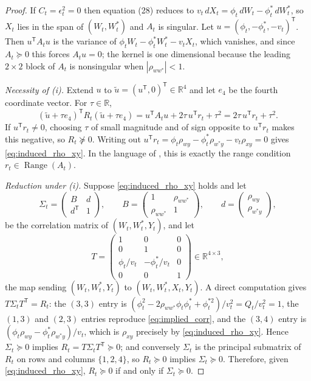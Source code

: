 \documentclass[11pt]{article}
\theoremstyle{definition}
\newcommand{\R}{\mathbb{R}}
\newcommand{\Range}{\operatorname{Range}}
\begin{document}
\begin{proof}
If $C_t=\epsilon_t^2=0$ then equation (28) reduces to $v_t\,dX_t=\phi_t\,dW_t-\phi_t^*\,dW_t^*$, so $X_t$ lies in the span of $(W_t,W_t^*)$ and $A_t$ is singular. Let $u=(\phi_t,-\phi_t^*,-v_t)^{\mathsf T}$. Then $u^{\mathsf T}A_tu$ is the variance of $\phi_tW_t-\phi_t^*W_t^*-v_tX_t$, which vanishes, and since $A_t\succeq0$ this forces $A_tu=0$; the kernel is one dimensional because the leading $2\times2$ block of $A_t$ is nonsingular when $|\rho_{ww^*}|<1$.

\emph{Necessity of \textnormal{(i)}.} Extend $u$ to $\tilde u=(u^{\mathsf T},0)^{\mathsf T}\in\R^4$ and let $e_4$ be the fourth coordinate vector. For $\tau\in\R$,
\[
(\tilde u+\tau e_4)^{\mathsf T}R_t(\tilde u+\tau e_4)
=u^{\mathsf T}A_tu+2\tau\,u^{\mathsf T}r_t+\tau^2
=2\tau\,u^{\mathsf T}r_t+\tau^2 .
\]
If $u^{\mathsf T}r_t\ne0$, choosing $\tau$ of small magnitude and of sign opposite to $u^{\mathsf T}r_t$ makes this negative, so $R_t\not\succeq0$. Writing out $u^{\mathsf T}r_t=\phi_t\rho_{wy}-\phi_t^*\rho_{w^*y}-v_t\rho_{xy}=0$ gives \eqref{eq:induced_rho_xy}. In the language of , this is exactly the range condition $r_t\in\Range(A_t)$.

\emph{Reduction under \textnormal{(i)}.} Suppose \eqref{eq:induced_rho_xy} holds and let
\[
\Sigma_t=\begin{pmatrix}B&d\\d^{\mathsf T}&1\end{pmatrix},
\qquad
B=\begin{pmatrix}1&\rho_{ww^*}\\\rho_{ww^*}&1\end{pmatrix},
\qquad
d=\begin{pmatrix}\rho_{wy}\\\rho_{w^*y}\end{pmatrix},
\]
be the correlation matrix of $(W_t,W_t^*,Y_t)$, and let
\[
T=\begin{pmatrix}
1&0&0\\
0&1&0\\
\phi_t/v_t&-\phi_t^*/v_t&0\\
0&0&1
\end{pmatrix}\in\R^{4\times3},
\]
the map sending $(W_t,W_t^*,Y_t)$ to $(W_t,W_t^*,X_t,Y_t)$. A direct computation gives $T\Sigma_tT^{\mathsf T}=R_t$: the $(3,3)$ entry is $(\phi_t^2-2\rho_{ww^*}\phi_t\phi_t^*+\phi_t^{*2})/v_t^2=Q_t/v_t^2=1$, the $(1,3)$ and $(2,3)$ entries reproduce \eqref{eq:implied_corr}, and the $(3,4)$ entry is $(\phi_t\rho_{wy}-\phi_t^*\rho_{w^*y})/v_t$, which is $\rho_{xy}$ precisely by \eqref{eq:induced_rho_xy}. Hence $\Sigma_t\succeq0$ implies $R_t=T\Sigma_tT^{\mathsf T}\succeq0$; and conversely $\Sigma_t$ is the principal submatrix of $R_t$ on rows and columns $\{1,2,4\}$, so $R_t\succeq0$ implies $\Sigma_t\succeq0$. Therefore, given \eqref{eq:induced_rho_xy}, $R_t\succeq0$ if and only if $\Sigma_t\succeq0$.


\end{proof}
\end{document}
